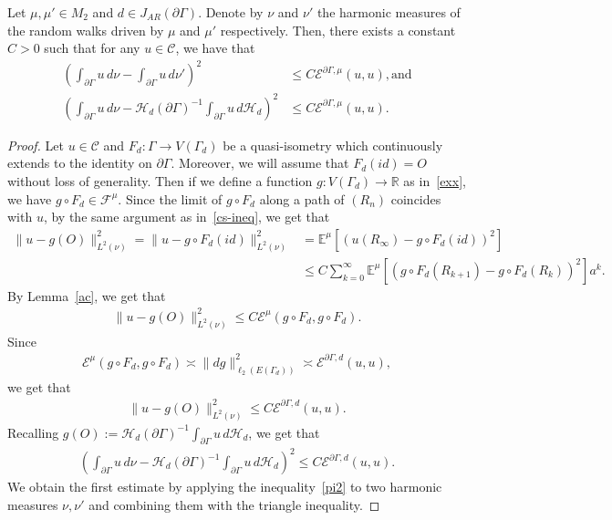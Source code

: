 \documentclass[10pt]{amsart}
\theoremstyle{definition}\newtheorem{defi}[theo]{Definition}\newtheorem{rema}[theo]{Remark}\newtheorem{exam}[theo]{Example}\newtheorem{exem}[theo]{Example}\newtheorem{nota}[theo]{Notation}
\newcommand{\ce}{\mathcal{E}}
\newcommand{\cf}{\mathcal{F}}
\newcommand{\ch}{\mathcal{H}}
\newcommand{\cC}{\mathcal{C}}
\newcommand{\br}{\mathbb{R}}
\newcommand{\be}{\mathbb{E}}
\begin{document}
\begin{prop}\label{pi}
Let $\mu,\mu'\in M_2$ and $d\in J_{AR}(\partial\Gamma)$. Denote by $\nu$ and $\nu'$ the harmonic measures of the random walks driven by $\mu$ and $\mu'$ respectively. Then, there exists a constant $C>0$ such that for any $u\in \cC$, we have that
\begin{align*}
\left(\int_{\partial\Gamma} u\, d\nu-\int_{\partial\Gamma} u\, d\nu'\right)^2&\leq C\ce^{\partial\Gamma,\mu}(u,u),\text{and}\\
\left(\int_{\partial\Gamma} u\, d\nu-\ch_{d}(\partial\Gamma)^{-1}\int_{\partial\Gamma} u\, d\ch_d\right)^2&\leq C\ce^{\partial\Gamma,\mu}(u,u).
\end{align*}
\end{prop}
\begin{proof}
Let $u\in\cC$ and $F_{d}:\Gamma\rightarrow V(\Gamma_{d})$ be a quasi-isometry which continuously extends to the identity on $\partial\Gamma$. Moreover, we will assume that $F_{d}(id)=O$ without loss of generality. Then if we define a function $g:V(\Gamma_{d})\to\br$ as in~\eqref{exx}, we have $g\circ F_{d}\in \cf^{\mu}$. Since the limit of $g\circ F_{d}$ along a path of $(R_n)$ coincides with $u$, by the same argument as in~\eqref{cs-ineq}, we get that
\begin{align*}
\|u-g(O)\|_{L^2(\nu)}^2=
\|u-g\circ F_{d}(id)\|_{L^2(\nu)}^2&=\be^{\mu}\left[\left(u(R_{\infty})- g\circ F_{d}(id)\right)^2\right]\\
&\leq C\sum_{k=0}^{\infty}\be^{\mu}\left[\left(g\circ F_{d}(R_{k+1})-g\circ F_{d}(R_k)\right)^2\right]a^k.
\end{align*}
By Lemma~\ref{ac}, we get that
\begin{align*}
\|u-g(O)\|_{L^2(\nu)}^2\leq C\ce^{\mu}(g\circ F_{d},g\circ F_{d}).
\end{align*}
Since
\begin{align*}
\ce^{\mu}(g\circ F_{d},g\circ F_{d})\asymp \|dg\|^2_{\ell_2(E(\Gamma_{d}))} \asymp \ce^{\partial\Gamma,d}(u,u),
\end{align*}
we get that
\begin{align}\label{pi; corrected}
\|u-g(O)\|_{L^2(\nu)}^2\leq C\ce^{\partial\Gamma,d}(u,u).
\end{align}
Recalling $g(O):=\ch_{d}(\partial\Gamma)^{-1}\int_{\partial\Gamma} u\, d\ch_d$, we get that
\begin{align}\label{pi2}
\left(\int_{\partial\Gamma} u\, d\nu-\ch_{d}(\partial\Gamma)^{-1}\int_{\partial\Gamma} u\, d\ch_d\right)^2\leq C\ce^{\partial\Gamma,d}(u,u).
\end{align}
We obtain the first estimate by applying the inequality~\eqref{pi2} to two harmonic measures $\nu,\nu'$ and combining them with the triangle inequality.
\end{proof}
\end{document}
